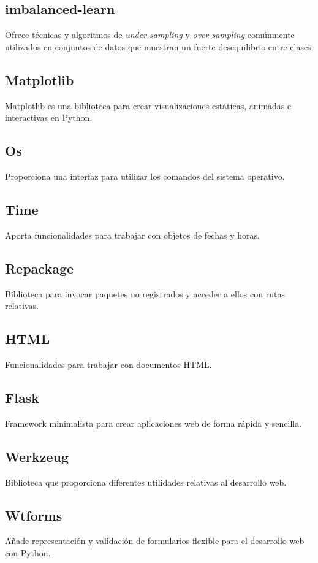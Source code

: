 \subsection{imbalanced-learn}
Ofrece técnicas y algoritmos de \textit{under-sampling} y \textit{over-sampling} comúnmente utilizados en conjuntos de datos que muestran un fuerte desequilibrio entre clases.

\subsection{Matplotlib}
Matplotlib es una biblioteca para crear visualizaciones estáticas, animadas e interactivas en Python.

\subsection{Os}
Proporciona una interfaz para utilizar los comandos del sistema operativo.

\subsection{Time}
Aporta funcionalidades para trabajar con objetos de fechas y horas.

\subsection{Repackage}
Biblioteca para invocar paquetes no registrados y acceder a ellos con rutas relativas.

\subsection{HTML}
Funcionalidades para trabajar con documentos HTML.

\subsection{Flask}
Framework minimalista para crear aplicaciones web de forma rápida y sencilla.

\subsection{Werkzeug}
Biblioteca que proporciona diferentes utilidades relativas al desarrollo web.

\subsection{Wtforms}
Añade representación y validación de formularios flexible para el desarrollo web con Python.

